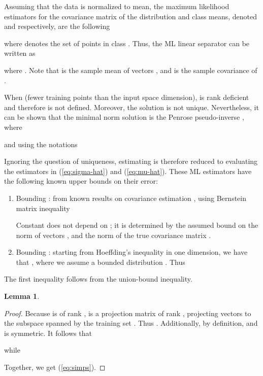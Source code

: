 \documentclass{article}
\newtheorem{lemma}{Lemma}
\begin{document}
Assuming that the data is normalized to  mean, the maximum likelihood estimators for the covariance matrix of the distribution  and class means, denoted  and  respectively, are the following

where  denotes the set of points in class . Thus, the ML linear separator can be written as

where . Note that  is the sample mean of vectors , and  is the sample covariance of .

When  (fewer training points than the input space dimension),  is rank deficient and therefore  is not defined. Moreover, the solution is not unique. Nevertheless, it can be shown that the minimal norm solution is the Penrose pseudo-inverse , where

and using the notations


Ignoring the question of uniqueness, estimating  is therefore reduced to evaluating the estimators in (\ref{eq:sigma-hat}) and (\ref{eq:mu-hat}). These ML estimators have the following known upper bounds on their error:
\begin{enumerate}
\item Bounding : from known results on covariance estimation \citep{DBLP:journals/ftml/Tropp15}, using Bernstein matrix inequality 

Constant  does not depend on ; it is determined by the assumed bound on the  norm of vectors , and the norm of the true covariance matrix .
\item Bounding : starting from Hoeffding's inequality in one dimension, we have that  , where we assume a bounded distribution . Thus 

\end{enumerate}
The first inequality follows from the union-bound inequality.






\begin{lemma}
\label{thm:new_lemma}

\end{lemma}

\begin{proof}
Because  is of rank ,  is a projection matrix of rank , projecting vectors to the subspace spanned by the training set . Thus . Additionally, by definition,  and  is symmetric. It follows that

while

Together, we get (\ref{eq:simps}).
\end{proof}
\end{document}
